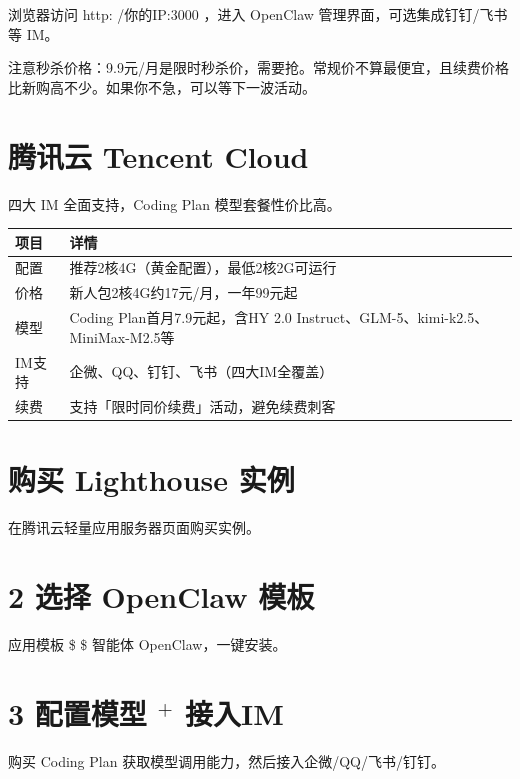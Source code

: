 \documentclass[
  10
]{article}
\newcounter{none} %
\begin{document}
浏览器访问 http: /你的IP:3000 ，进入 OpenClaw
管理界面，可选集成钉钉/飞书等 IM。

注意秒杀价格：9.9元/月是限时秒杀价，需要抢。常规价不算最便宜，且续费价格比新购高不少。如果你不急，可以等下一波活动。

\section{腾讯云 Tencent Cloud}\label{ux817eux8bafux4e91-tencent-cloud}

四大 IM 全面支持，Coding Plan 模型套餐性价比高。

{\def\LTcaptype{none} %
\begin{longtable}[]{@{}|l|l|@{}}
\toprule\noalign{}
\endhead
\bottomrule\noalign{}
\endlastfoot
\hline
项目 & 详情 \\
\hline
配置 & 推荐2核4G（黄金配置），最低2核2G可运行 \\
\hline
价格 & 新人包2核4G约17元/月，一年99元起 \\
\hline
模型 & Coding Plan首月7.9元起，含HY 2.0
Instruct、GLM-5、kimi-k2.5、MiniMax-M2.5等 \\
\hline
IM支持 & 企微、QQ、钉钉、飞书（四大IM全覆盖） \\
\hline
续费 & 支持「限时同价续费」活动，避免续费刺客 \\
\hline
\end{longtable}
}

\section{购买 Lighthouse
实例}\label{ux8d2dux4e70-lighthouse-ux5b9eux4f8b}

在腾讯云轻量应用服务器页面购买实例。

\section{2 选择 OpenClaw 模板}\label{ux9009ux62e9-openclaw-ux6a21ux677f}

应用模板 \$ \$ 智能体 OpenClaw，一键安装。

\section{\texorpdfstring{3 配置模型 \(^ +\)
接入IM}{3 配置模型 \^{} + 接入IM}}\label{ux914dux7f6eux6a21ux578b-ux63a5ux5165im}

购买 Coding Plan 获取模型调用能力，然后接入企微/QQ/飞书/钉钉。
\end{document}
